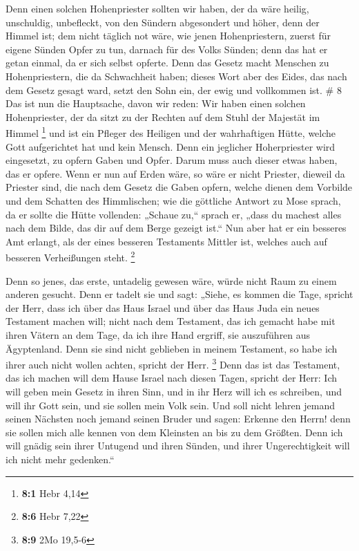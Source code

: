  Denn einen solchen Hohenpriester sollten wir haben, der da
wäre heilig, unschuldig, unbefleckt, von den Sündern abgesondert und
höher, denn der Himmel ist;  dem nicht täglich not wäre,
wie jenen Hohenpriestern, zuerst für eigene Sünden Opfer zu tun, darnach
für des Volks Sünden; denn das hat er getan einmal, da er sich selbst
opferte.  Denn das Gesetz macht Menschen zu Hohenpriestern,
die da Schwachheit haben; dieses Wort aber des Eides, das nach dem
Gesetz gesagt ward, setzt den Sohn ein, der ewig und vollkommen ist. \#
8  Das ist nun die Hauptsache, davon wir reden: Wir haben
einen solchen Hohenpriester, der da sitzt zu der Rechten auf dem Stuhl
der Majestät im Himmel \footnote{\textbf{8:1} Hebr 4,14} 
und ist ein Pfleger des Heiligen und der wahrhaftigen Hütte, welche Gott
aufgerichtet hat und kein Mensch.  Denn ein jeglicher
Hoherpriester wird eingesetzt, zu opfern Gaben und Opfer. Darum muss
auch dieser etwas haben, das er opfere.  Wenn er nun auf
Erden wäre, so wäre er nicht Priester, dieweil da Priester sind, die
nach dem Gesetz die Gaben opfern,  welche dienen dem
Vorbilde und dem Schatten des Himmlischen; wie die göttliche Antwort zu
Mose sprach, da er sollte die Hütte vollenden: „Schaue zu,`` sprach er,
„dass du machest alles nach dem Bilde, das dir auf dem Berge gezeigt
ist.``  Nun aber hat er ein besseres Amt erlangt, als der
eines besseren Testaments Mittler ist, welches auch auf besseren
Verheißungen steht. \footnote{\textbf{8:6} Hebr 7,22}

 Denn so jenes, das erste, untadelig gewesen wäre, würde
nicht Raum zu einem anderen gesucht.  Denn er tadelt sie und
sagt: „Siehe, es kommen die Tage, spricht der Herr, dass ich über das
Haus Israel und über das Haus Juda ein neues Testament machen will;
 nicht nach dem Testament, das ich gemacht habe mit ihren
Vätern an dem Tage, da ich ihre Hand ergriff, sie auszuführen aus
Ägyptenland. Denn sie sind nicht geblieben in meinem Testament, so habe
ich ihrer auch nicht wollen achten, spricht der Herr. \footnote{\textbf{8:9}
  2Mo 19,5-6}  Denn das ist das Testament, das ich machen
will dem Hause Israel nach diesen Tagen, spricht der Herr: Ich will
geben mein Gesetz in ihren Sinn, und in ihr Herz will ich es schreiben,
und will ihr Gott sein, und sie sollen mein Volk sein.  Und
soll nicht lehren jemand seinen Nächsten noch jemand seinen Bruder und
sagen: Erkenne den Herrn! denn sie sollen mich alle kennen von dem
Kleinsten an bis zu dem Größten.  Denn ich will gnädig sein
ihrer Untugend und ihren Sünden, und ihrer Ungerechtigkeit will ich
nicht mehr gedenken.``

